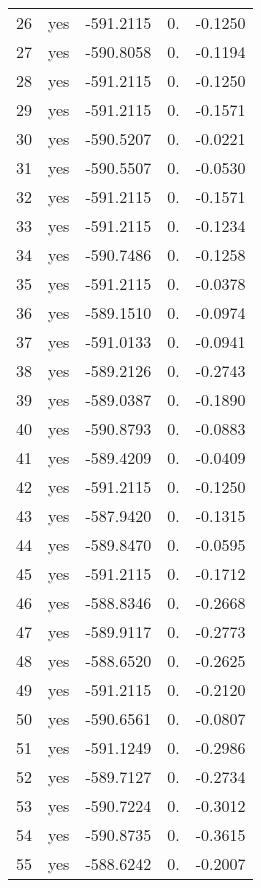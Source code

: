 \begin{table}[h]
\begin{tabular}{ccccc}
        26 & yes &  -591.2115 & 0. &  -0.1250 \\
        27 & yes &  -590.8058 & 0. &  -0.1194 \\
        28 & yes &  -591.2115 & 0. &  -0.1250 \\
        29 & yes &  -591.2115 & 0. &  -0.1571 \\
        30 & yes &  -590.5207 & 0. &  -0.0221 \\
        31 & yes &  -590.5507 & 0. &  -0.0530 \\
        32 & yes &  -591.2115 & 0. &  -0.1571 \\
        33 & yes &  -591.2115 & 0. &  -0.1234 \\
        34 & yes &  -590.7486 & 0. &  -0.1258 \\
        35 & yes &  -591.2115 & 0. &  -0.0378 \\
        36 & yes &  -589.1510 & 0. &  -0.0974 \\
        37 & yes &  -591.0133 & 0. &  -0.0941 \\
        38 & yes &  -589.2126 & 0. &  -0.2743 \\
        39 & yes &  -589.0387 & 0. &  -0.1890 \\
        40 & yes &  -590.8793 & 0. &  -0.0883 \\
        41 & yes &  -589.4209 & 0. &  -0.0409 \\
        42 & yes &  -591.2115 & 0. &  -0.1250 \\
        43 & yes &  -587.9420 & 0. &  -0.1315 \\
        44 & yes &  -589.8470 & 0. &  -0.0595 \\
        45 & yes &  -591.2115 & 0. &  -0.1712 \\
        46 & yes &  -588.8346 & 0. &  -0.2668 \\
        47 & yes &  -589.9117 & 0. &  -0.2773 \\
        48 & yes &  -588.6520 & 0. &  -0.2625 \\
        49 & yes &  -591.2115 & 0. &  -0.2120 \\
        50 & yes &  -590.6561 & 0. &  -0.0807 \\
        51 & yes &  -591.1249 & 0. &  -0.2986 \\
        52 & yes &  -589.7127 & 0. &  -0.2734 \\
        53 & yes &  -590.7224 & 0. &  -0.3012 \\
        54 & yes &  -590.8735 & 0. &  -0.3615 \\
        55 & yes &  -588.6242 & 0. &  -0.2007 \\

\end{tabular}
\end{table}
